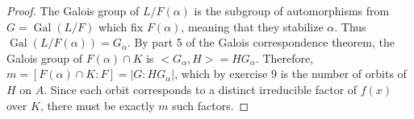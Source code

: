 \documentclass[10pt]{article}
\DeclareMathOperator*{\Gal}{Gal}
\begin{document}
\begin{enumerate}
\begin{proof}
The Galois group of $L / F(\alpha)$ is the subgroup of automorphisms from $G = \Gal(L/F)$ which fix $F(\alpha)$, meaning that they stabilize $\alpha$.  Thus $\Gal(L/F(\alpha)) = G_{\alpha}$.  By part 5 of the Galois correspondence theorem, the Galois group of $F(\alpha) \cap K$ is $<G_{\alpha}, H> = HG_{\alpha}$.  Therefore, $m = [F(\alpha)\cap K : F] = |G : HG_{\alpha}|$, which by exercise 9 is the number of orbits of $H$ on $A$.  Since each orbit corresponds to a distinct irreducible factor of $f(x)$ over $K$, there must be exactly $m$ such factors.


\end{proof}

\end{enumerate}
\end{document}
